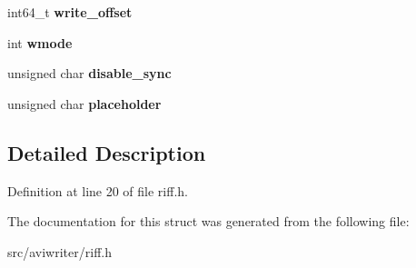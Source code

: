 \begin{DoxyCompactItemize}
\item 
\hypertarget{structriff__chunk_a200cb872802fb92593dcefc54462d40d}{int64\-\_\-t {\bfseries write\-\_\-offset}}\label{structriff__chunk_a200cb872802fb92593dcefc54462d40d}

\item 
\hypertarget{structriff__chunk_ab0dd241e6b8a042eca1210562e76fa95}{int {\bfseries wmode}}\label{structriff__chunk_ab0dd241e6b8a042eca1210562e76fa95}

\item 
\hypertarget{structriff__chunk_a96086dacbe6865ea8947b79bb8d1b85f}{unsigned char {\bfseries disable\-\_\-sync}}\label{structriff__chunk_a96086dacbe6865ea8947b79bb8d1b85f}

\item 
\hypertarget{structriff__chunk_a8b8ed824444ca63292ca77fdb91a5576}{unsigned char {\bfseries placeholder}}\label{structriff__chunk_a8b8ed824444ca63292ca77fdb91a5576}

\end{DoxyCompactItemize}


\subsection{Detailed Description}


Definition at line 20 of file riff.\-h.



The documentation for this struct was generated from the following file\-:\begin{DoxyCompactItemize}
\item 
src/aviwriter/riff.\-h\end{DoxyCompactItemize}

